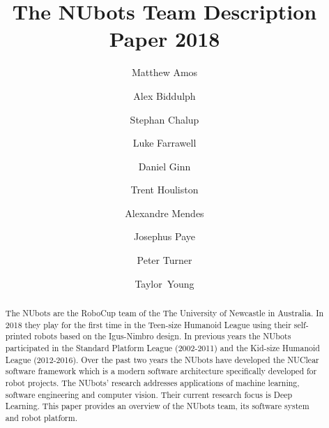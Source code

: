 \documentclass{llncs}
\begin{document}
%

\frontmatter          %
%
\pagestyle{headings}  %
%
%
\mainmatter              %
%
\title{The NUbots Team Description Paper 2018}
%

\author{Matthew Amos
        \and Alex Biddulph
        \and Stephan Chalup
        \and Luke Farrawell
        \and Daniel Ginn
        \and Trent Houliston
		\and Alexandre Mendes
        \and Josephus Paye
        \and Peter Turner
        \and Taylor~Young
        }
       
%
%

%
%

\maketitle              %


\begin{abstract}
The NUbots are the RoboCup team of the The University of Newcastle in Australia. In 2018 they play for the first time in the Teen-size Humanoid League using their self-printed robots based on the Igus-Nimbro design. In previous years the NUbots participated in the Standard Platform League (2002-2011) and the Kid-size Humanoid League (2012-2016). Over the past two years the NUbots have developed the NUClear software framework which is a modern software architecture specifically developed for robot projects. The NUbots' research addresses applications of machine learning, software engineering and computer vision. Their current research focus is Deep Learning. This paper provides an overview of the NUbots team, its software system and robot platform. 
\end{abstract}
\end{document}
